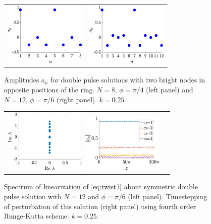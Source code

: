 \documentclass[reprint, amsmath,amssymb,aps,pra]{revtex4-2}
\begin{document}
\begin{figure}
\begin{center}
\begin{tabular}{cc}
\includegraphics[width=4cm]{dp8pi4} &
\includegraphics[width=4cm]{dp12pi6}
\end{tabular}
\end{center}
\caption{Amplitudes $a_n$ for double pulse solutions with two bright nodes in opposite positions of the ring. $N=8$, $\phi=\pi/4$ (left panel) and $N=12$, $\phi=\pi/6$ (right panel). $k=0.25$.}
\label{fig:dp}
\end{figure}

\begin{figure}
\begin{center}
\begin{tabular}{cc}
\includegraphics[width=4cm]{dp12pi6spec.eps}
\includegraphics[width=4cm]{dp12pi6pert.eps}
\end{tabular}
\end{center}
\caption{Spectrum of linearization of \cref{eq:twist1} about symmetric double pulse solution with $N=12$ and $\phi = \pi/6$ (left panel). Timestepping of perturbation of this solution (right panel) using fourth order Runge-Kutta scheme. $k=0.25$.}
\label{fig:dpstab}
\end{figure}
\end{document}
